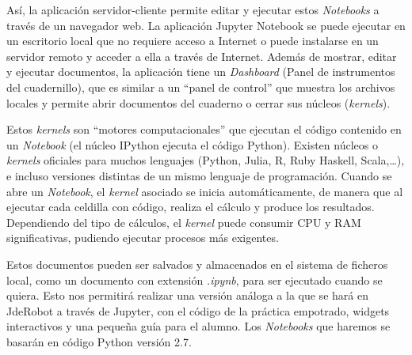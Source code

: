 Así, la aplicación servidor-cliente permite editar y ejecutar estos \textit{Notebooks} a través de un navegador web. La aplicación Jupyter Notebook se puede ejecutar en un escritorio local que no requiere acceso a Internet o puede instalarse en un servidor remoto y acceder a ella a través de Internet. Además de mostrar, editar y ejecutar documentos, la aplicación tiene un \textit{Dashboard} (Panel de instrumentos del cuadernillo), que es similar a un ``panel de control'' que muestra los archivos locales y permite abrir documentos del cuaderno o cerrar sus núcleos (\textit{kernels}). 

Estos \textit{kernels} son ``motores computacionales'' que ejecutan el código contenido en un \textit{Notebook} (el núcleo IPython ejecuta el código Python). Existen núcleos o \textit{kernels} oficiales para muchos lenguajes (Python, Julia, R, Ruby Haskell, Scala,…), e incluso versiones distintas de un mismo lenguaje de programación. Cuando se abre un \textit{Notebook}, el \textit{kernel} asociado se inicia automáticamente, de manera que al ejecutar cada celdilla con código, realiza el cálculo y produce los resultados.  Dependiendo del tipo de cálculos, el \textit{kernel} puede consumir CPU y RAM significativas, pudiendo ejecutar procesos más exigentes. 

Estos documentos pueden ser salvados y almacenados en el sistema de ficheros local, como un documento con extensión \textit{.ipynb}, para ser ejecutado cuando se quiera. Esto nos permitirá realizar una versión análoga a la que se hará en JdeRobot a través de Jupyter, con el código de la práctica empotrado, widgets interactivos y una pequeña guía para el alumno. Los \textit{Notebooks} que haremos se basarán en código Python versión 2.7. 